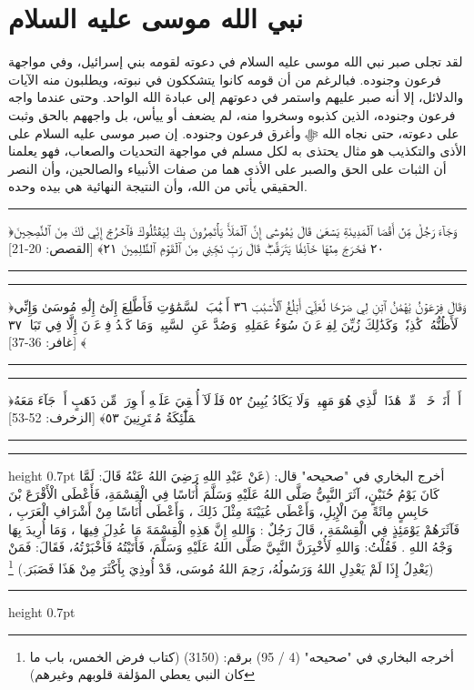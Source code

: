 \documentclass[12pt,openany]{book}
\newenvironment{quranblock}
  {\par\medskip\begin{center}\begin{minipage}{0.92\linewidth}\centering\quranfont\large\color{ink}\hrule\vspace{0.65em}}
  {\vspace{0.65em}\hrule\end{minipage}\end{center}\medskip}
\newenvironment{hadithblock}
  {\par\medskip\noindent\begin{minipage}{\linewidth}\hrule height 0.7pt \vspace{0.6em}\small}
  {\vspace{0.4em}\hrule height 0.7pt\end{minipage}\par\medskip}
\begin{document}
\section{نبي الله موسى عليه السلام}
لقد تجلى صبر نبي الله موسى عليه السلام في دعوته لقومه بني إسرائيل، وفي مواجهة فرعون وجنوده. فبالرغم من أن قومه كانوا يتشككون في نبوته، ويطلبون منه الآيات والدلائل، إلا أنه صبر عليهم واستمر في دعوتهم إلى عبادة الله الواحد. وحتى عندما واجه فرعون وجنوده، الذين كذبوه وسخروا منه، لم يضعف أو ييأس، بل واجههم بالحق وثبت على دعوته، حتى نجاه الله ﷻ وأغرق فرعون وجنوده. إن صبر موسى عليه السلام على الأذى والتكذيب هو مثال يحتذى به لكل مسلم في مواجهة التحديات والصعاب، فهو يعلمنا أن الثبات على الحق والصبر على الأذى هما من صفات الأنبياء والصالحين، وأن النصر الحقيقي يأتي من الله، وأن النتيجة النهائية هي بيده وحده.

\begin{quranblock}
﴿وَجَآءَ رَجُلٞ مِّنۡ أَقۡصَا ٱلۡمَدِينَةِ يَسۡعَىٰ قَالَ يَٰمُوسَىٰٓ إِنَّ ٱلۡمَلَأَ يَأۡتَمِرُونَ بِكَ لِيَقۡتُلُوكَ فَٱخۡرُجۡ إِنِّي لَكَ مِنَ ٱلنَّٰصِحِينَ ٢٠ فَخَرَجَ مِنۡهَا ‌خَآئِفٗا ‌يَتَرَقَّبُۖ قَالَ رَبِّ نَجِّنِي مِنَ ٱلۡقَوۡمِ ٱلظَّٰلِمِينَ ٢١﴾ [القصص: 20-21]
\end{quranblock}

\begin{quranblock}
﴿وَقَالَ فِرۡعَوۡنُ يَٰهَٰمَٰنُ ٱبۡنِ لِي صَرۡحٗا لَّعَلِّيٓ أَبۡلُغُ ٱلۡأَسۡبَٰبَ ٣٦ ‌أَسۡبَٰبَ ‌ٱلسَّمَٰوَٰتِ فَأَطَّلِعَ إِلَىٰٓ إِلَٰهِ مُوسَىٰ وَإِنِّي لَأَظُنُّهُۥ كَٰذِبٗاۚ وَكَذَٰلِكَ زُيِّنَ لِفِرۡعَوۡنَ سُوٓءُ عَمَلِهِۦ وَصُدَّ عَنِ ٱلسَّبِيلِۚ وَمَا كَيۡدُ فِرۡعَوۡنَ إِلَّا فِي تَبَابٖ ٣٧ ﴾ [غافر: 36-37]
\end{quranblock}

\begin{quranblock}
﴿أَمۡ أَنَا۠ خَيۡرٞ ‌مِّنۡ ‌هَٰذَا ‌ٱلَّذِي ‌هُوَ مَهِينٞ وَلَا يَكَادُ يُبِينُ ٥٢ فَلَوۡلَآ أُلۡقِيَ عَلَيۡهِ أَسۡوِرَةٞ مِّن ذَهَبٍ أَوۡ جَآءَ مَعَهُ ٱلۡمَلَٰٓئِكَةُ مُقۡتَرِنِينَ ٥٣﴾ [الزخرف: 52-53]
\end{quranblock}

\begin{hadithblock}
أخرج البخاري في "صحيحه" قال: (عَنْ عَبْدِ اللهِ رَضِيَ اللهُ عَنْهُ قَالَ: لَمَّا كَانَ يَوْمُ حُنَيْنٍ، آثَرَ النَّبِيُّ صَلَّى اللهُ عَلَيْهِ وَسَلَّمَ أُنَاسًا فِي الْقِسْمَةِ، فَأَعْطَى الْأَقْرَعَ بْنَ حَابِسٍ مِائَةً مِنَ الْإِبِلِ، وَأَعْطَى عُيَيْنَةَ مِثْلَ ذَلِكَ ، وَأَعْطَى أُنَاسًا مِنْ أَشْرَافِ الْعَرَبِ ، فَآثَرَهُمْ يَوْمَئِذٍ فِي الْقِسْمَةِ ، قَالَ رَجُلٌ : وَاللهِ إِنَّ هَذِهِ الْقِسْمَةَ مَا عُدِلَ فِيهَا ، وَمَا أُرِيدَ بِهَا وَجْهُ اللهِ . فَقُلْتُ: وَاللهِ لَأُخْبِرَنَّ النَّبِيَّ صَلَّى اللهُ عَلَيْهِ وَسَلَّمَ، فَأَتَيْتُهُ فَأَخْبَرْتُهُ، فَقَالَ: فَمَنْ يَعْدِلُ إِذَا لَمْ يَعْدِلِ اللهُ وَرَسُولُهُ، رَحِمَ اللهُ مُوسَى، قَدْ أُوذِيَ بِأَكْثَرَ مِنْ هَذَا فَصَبَرَ.) \footnote{أخرجه البخاري في "صحيحه" (4 / 95) برقم: (3150) (كتاب فرض الخمس، باب ما كان النبي يعطي المؤلفة قلوبهم وغيرهم)})
\end{hadithblock}
\end{document}
